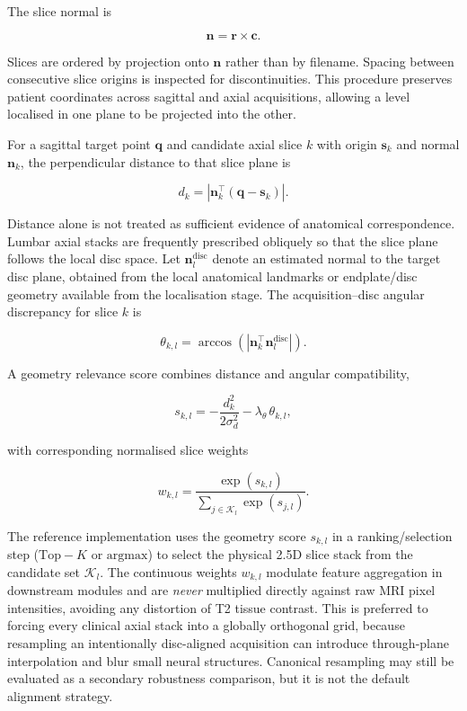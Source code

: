 The slice normal is

\begin{equation}
\mathbf{n}=\mathbf{r}\times\mathbf{c}.
\label{eq:slice-normal}
\end{equation}

Slices are ordered by projection onto $\mathbf{n}$ rather than by filename.
Spacing between consecutive slice origins is inspected for discontinuities.
This procedure preserves patient coordinates across sagittal and axial
acquisitions, allowing a level localised in one plane to be projected into the
other.

For a sagittal target point $\mathbf{q}$ and candidate axial slice $k$ with
origin $\mathbf{s}_k$ and normal $\mathbf{n}_k$, the perpendicular distance to
that slice plane is

\begin{equation}
d_k =
\left|
\mathbf{n}_k^\top(\mathbf{q}-\mathbf{s}_k)
\right|.
\label{eq:plane-distance}
\end{equation}

Distance alone is not treated as sufficient evidence of anatomical
correspondence. Lumbar axial stacks are frequently prescribed obliquely so that
the slice plane follows the local disc space. Let $\mathbf{n}^{\mathrm{disc}}_l$
denote an estimated normal to the target disc plane, obtained from the local
anatomical landmarks or endplate/disc geometry available from the localisation
stage. The acquisition--disc angular discrepancy for slice $k$ is

\begin{equation}
\theta_{k,l}
=
\arccos\!\left(
\left|\mathbf{n}_k^\top\mathbf{n}^{\mathrm{disc}}_l\right|
\right).
\label{eq:acquisition-angle}
\end{equation}

A geometry relevance score combines distance and angular compatibility,

\begin{equation}
s_{k,l}
=
-\frac{d_k^2}{2\sigma_d^2}
-\lambda_{\theta}\,\theta_{k,l},
\label{eq:geometry-score}
\end{equation}

with corresponding normalised slice weights

\begin{equation}
w_{k,l}
=
\frac{\exp(s_{k,l})}
{\sum_{j\in\mathcal{K}_l}\exp(s_{j,l})}.
\label{eq:geometry-weight}
\end{equation}

The reference implementation uses the geometry score $s_{k,l}$ in a ranking/selection step ($\mathrm{Top-}K$ or $\mathrm{argmax}$) to select the physical 2.5D slice stack from the candidate set $\mathcal{K}_l$. The continuous weights $w_{k,l}$ modulate feature aggregation in downstream modules and are \emph{never} multiplied directly against raw MRI pixel intensities, avoiding any distortion of T2 tissue contrast. This is preferred to forcing every clinical axial stack into a globally orthogonal grid,
because resampling an intentionally disc-aligned acquisition can introduce
through-plane interpolation and blur small neural structures. Canonical
resampling may still be evaluated as a secondary robustness comparison, but it
is not the default alignment strategy.

